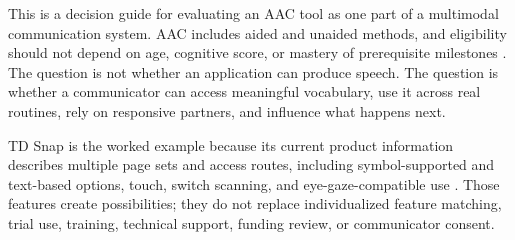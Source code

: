 

This is a decision guide for evaluating an AAC tool as one part of a multimodal communication system. AAC includes aided and unaided methods, and eligibility should not depend on age, cognitive score, or mastery of prerequisite milestones \citep{ashaAAC,mirenda2015aids}. The question is not whether an application can produce speech. The question is whether a communicator can access meaningful vocabulary, use it across real routines, rely on responsive partners, and influence what happens next.

TD Snap is the worked example because its current product information describes multiple page sets and access routes, including symbol-supported and text-based options, touch, switch scanning, and eye-gaze-compatible use \citep{tobii2026tdsnap}. Those features create possibilities; they do not replace individualized feature matching, trial use, training, technical support, funding review, or communicator consent.

